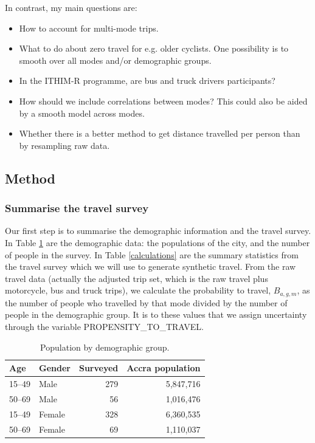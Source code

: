\documentclass{article}
\begin{document}
\begin{appendix}
In contrast, my main questions are:
\begin{itemize}
\item How to account for multi-mode trips.
\item What to do about zero travel for e.g. older cyclists. One possibility is to smooth over all modes and/or demographic groups.
\item In the ITHIM-R programme, are bus and truck drivers participants?
\item How should we include correlations between modes? This could also be aided by a smooth model across modes.
\item Whether there is a better method to get distance travelled per person than by resampling raw data.
\end{itemize}

\subsection{Method}

\subsubsection{Summarise the travel survey}

Our first step is to summarise the demographic information and the travel survey. In Table \ref{population} are the demographic data: the populations of the city, and the number of people in the survey. In Table \ref{calculations} are the summary statistics from the travel survey which we will use to generate synthetic travel. From the raw travel data (actually the adjusted trip set, which is the raw travel plus motorcycle, bus and truck trips), we calculate the probability to travel, $B_{a,g,m}$, as the number of people who travelled by that mode divided by the number of people in the demographic group. It is to these values that we assign uncertainty through the variable PROPENSITY\_TO\_TRAVEL. 



\begin{table}[ht]
\begin{center}
\caption{\small Population by demographic group.}
\begin{tabular}{llrr}
\label{population}
Age & Gender & Surveyed & Accra population \\
\hline
15--49  & Male & 279 & 5,847,716 \\
50--69  & Male & 56 & 1,016,476 \\
15--49  & Female & 328 & 6,360,535 \\
50--69  & Female & 69 & 1,110,037 \\
\hline
\end{tabular}
\end{center}
\end{table}


\end{appendix}
\end{document}
